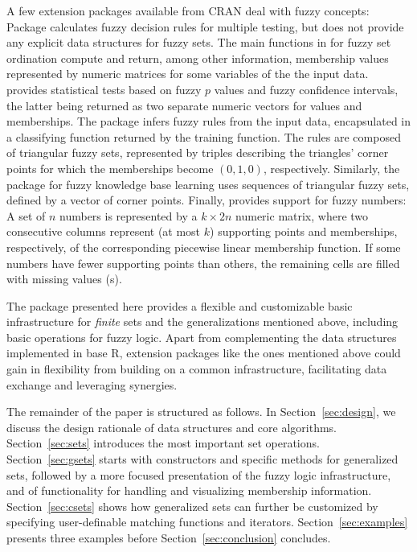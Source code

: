 \documentclass[article]{jss}
\newcommand\R{\textsf{R}}
\begin{document}
A few extension packages available from CRAN deal
with fuzzy concepts: Package 
\citep{sets:lewin:2007}
calculates fuzzy decision rules for multiple testing, but does not
provide any explicit data structures for fuzzy sets.
The main functions in 
\citep{sets:roberts:2007} for fuzzy set ordination compute and
return, among other information, membership values represented by
numeric matrices for some variables of the the input data.
 \citep{sets:geyer:2007} provides statistical tests
based on
fuzzy $p$ values and fuzzy confidence intervals, the latter being
returned as two separate numeric vectors for values and memberships. The
 package \citep{sets:vinterbo:2007}
infers fuzzy rules from the input data,
encapsulated in a classifying function returned by the training
function. The rules are composed of triangular fuzzy sets, represented
by triples describing the triangles' corner points for which the
memberships become $(0,1,0)$, respectively. Similarly, the 
package for fuzzy knowledge base learning \citep{sets:alvarez:2007}
uses sequences of triangular fuzzy sets, defined by a vector of corner
points. Finally,  \citep{sets:aklan+altindas+macit:2008}
provides support for fuzzy
numbers: A set of $n$ numbers is represented by a $k \times 2n$
numeric matrix, where two consecutive columns represent (at most $k$)
supporting points and memberships,
respectively, of the corresponding piecewise linear
membership function. If some numbers have fewer supporting points than
others, the remaining cells are filled with missing values (s).

The  package
\citep{sets:meyer+hornik:2008} presented here
provides a flexible and customizable basic infrastructure for
\emph{finite} sets and the generalizations mentioned above, including
basic operations for fuzzy logic. Apart from complementing the data
structures implemented in
base \R, extension packages like the ones mentioned above
could gain in flexibility from building on a common infrastructure,
facilitating data exchange and leveraging synergies.

The remainder of the paper is
structured as follows. In Section~\ref{sec:design}, we discuss the
design rationale of data structures and core algorithms.
Section~\ref{sec:sets} introduces the most important set
operations. Section~\ref{sec:gsets} starts with constructors and
specific methods for generalized sets, followed by a more focused
presentation of the fuzzy logic infrastructure, and of functionality for
handling and visualizing membership information. Section~\ref{sec:csets}
shows how generalized sets can further be customized by specifying
user-definable matching functions and
iterators.  Section~\ref{sec:examples} presents three examples before
Section~\ref{sec:conclusion} concludes.
\end{document}
